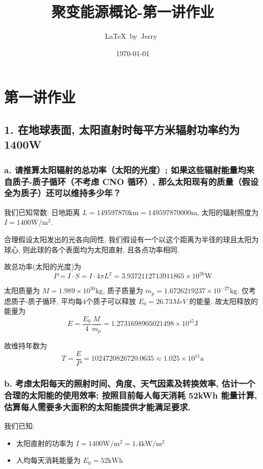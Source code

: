 \documentclass{article}
\title{聚变能源概论-第一讲作业}
\author{\LaTeX\ by\ Jerry\ }
\date{\today}
\begin{document}
\pagestyle{fancy}

\fancyhead[R]{\today}

\section*{第一讲作业}

\subsection*{1. 在地球表面, 太阳直射时每平方米辐射功率约为1400W}

\subsubsection*{a. 请推算太阳辐射的总功率（太阳的光度）; 如果这些辐射能量均来自质子-质子循环（不考虑 CNO 循环）, 那么太阳现有的质量（假设全为质子）还可以维持多少年？}

我们已知常数: 日地距离 $L=149597870\text{km} = 149597870000\text{m}$, 太阳的辐射照度为 $I=1400\text{W}/\text{m}^2$.

合理假设太阳发出的光各向同性, 我们假设有一个以这个距离为半径的球且太阳为球心, 则此球的各个表面均为太阳直射, 且各点功率相同. 

故总功率(太阳的光度)为
$$P = I \cdot S = I \cdot 4 \pi L^2 = 3.9372112713911865 \times 10^{26} \text{W}$$

太阳质量为 $M=1.989 \times 10^{30} \text{kg}$, 质子质量为 $m_p=1.6726219237\times 10^{-27} \text{kg}$. 仅考虑质子-质子循环, 平均每4个质子可以释放 $E_0 = 26.73 MeV$ 的能量. 故太阳释放的能量为
$$E = \frac{E_0}{4} \frac{M}{m_p} = 1.2731698905021498 \times {10}^{45} \text{J}$$

故维持年数为
$$T = \frac{E}{P} = 1024720826720.0635 \approx 1.025 \times {10}^{11} \text{a}$$

\subsubsection*{b. 考虑太阳每天的照射时间、角度、天气因素及转换效率, 估计一个合理的太阳能的使用效率; 按照目前每人每天消耗 52kWh 能量计算, 估算每人需要多大面积的太阳能提供才能满足要求. }

我们已知:
\begin{itemize}
    \item 太阳直射的功率为 $I = 1400\text{W}/\text{m}^2 = 1.4 \text{kW} / \text{m}^2$
    \item 人均每天消耗能量为 $E_0 = 52\text{kWh}$
\end{itemize}
\end{document}
